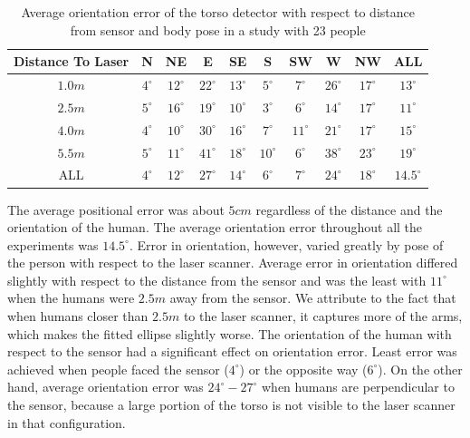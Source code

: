 \begin{table}[ht!]
\centering
\begin{tabular}{cSSSSSSSSS}    
 \toprule 
Distance To Laser & {N} & {NE} & {E} & {SE} & {S} & {SW} & {W} & {NW} & {ALL}\\
\midrule
{$1.0m$} & {$4^{\circ}$} & {$12^{\circ}$} & {$22^{\circ}$} & {$13^{\circ}$} & {$5^{\circ}$} & {$7^{\circ}$} & {$26^{\circ}$} & {$17^{\circ}$} & {$13^{\circ}$} \\
{$2.5m$} & {$5^{\circ}$} & {$16^{\circ}$} & {$19^{\circ}$} & {$10^{\circ}$} & {$3^{\circ}$} & {$6^{\circ}$} & {$14^{\circ}$} & {$17^{\circ}$} & {$11^{\circ}$} \\ 

{$4.0m$} & {$4^{\circ}$} & {$10^{\circ}$} & {$30^{\circ}$} & {$16^{\circ}$} & {$7^{\circ}$} & {$11^{\circ}$} & {$21^{\circ}$} & {$17^{\circ}$} & {$15^{\circ}$} \\ 
{$5.5m$} & {$5^{\circ}$} & {$11^{\circ}$} & {$41^{\circ}$} & {$18^{\circ}$} & {$10^{\circ}$} & {$6^{\circ}$} & {$38^{\circ}$} & {$23^{\circ}$} & {$19^{\circ}$} \\ 

{ALL} & {$4^{\circ}$} & {$12^{\circ}$} & {$27^{\circ}$} & {$14^{\circ}$} & {$6^{\circ}$} & {$7^{\circ}$} & {$24^{\circ}$} & {$18^{\circ}$} & {$14.5^{\circ}$} \\
\bottomrule
\end{tabular}
\caption{Average orientation error of the torso detector with respect to distance from sensor and body pose in a study with 23 people}
\label{table:torso_tracking_results}
\end{table}

The average positional error was about $5cm$ regardless of the distance and the orientation of the human. The average orientation error throughout all the experiments was $14.5^{\circ}$. Error in orientation, however, varied greatly by pose of the person with respect to the laser scanner. Average error in orientation differed slightly with respect to the distance from the sensor and was the least with $11^{\circ}$ when the humans were $2.5m$ away from the sensor. We attribute to the fact that when humans closer than $2.5m$ to the laser scanner, it captures more of the arms, which makes the fitted ellipse slightly worse. The orientation of the human with respect to the sensor had a significant effect on orientation error. Least error was achieved when people faced the sensor  ($4^{\circ}$) or the opposite way ($6^{\circ}$). On the other hand, average orientation error was $24^{\circ}-27^{\circ}$ when humans are perpendicular to the sensor, because a large portion of the torso is not visible to the laser scanner in that configuration.

